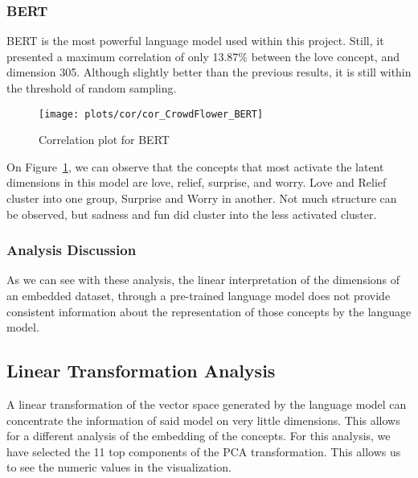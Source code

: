\subsubsection{BERT}
BERT is the most powerful language model used within this project. Still, it presented a maximum correlation of only 13.87\% between the love concept, and dimension 305. Although slightly better than the previous results, it is still within the threshold of random sampling.
\begin{figure}[H]
  \texttt{[image: plots/cor/cor\_CrowdFlower\_BERT]}
  \centering
  \caption{Correlation plot for BERT}\label{fig:cor_CrowdFlower_BERT}
\end{figure}
On Figure~\ref{fig:cor_CrowdFlower_BERT}, we can observe that the concepts that most activate the latent dimensions in this model are love, relief, surprise, and worry. Love and Relief cluster into one group, Surprise and Worry in another. Not much structure can be observed, but sadness and fun did cluster into the less activated cluster.

\subsubsection{Analysis Discussion}
As we can see with these analysis, the linear interpretation of the dimensions of an embedded dataset, through a pre-trained language model does not provide consistent information about the representation of those concepts by the language model.


\subsection{Linear Transformation Analysis}\label{sub:Linear Transformation Analysis}
A linear transformation of the vector space generated by the language model can concentrate the information of said model on very little dimensions. This allows for a different analysis of the embedding of the concepts. For this analysis, we have selected the 11 top components of the PCA transformation. This allows us to see the numeric values in the visualization.

